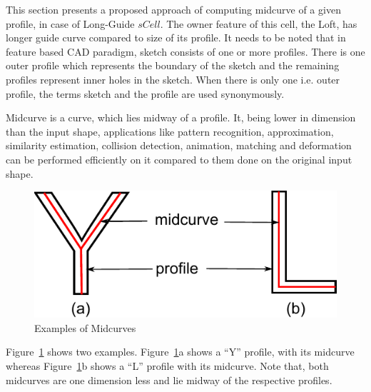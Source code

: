 This section presents a proposed approach of computing midcurve of a given profile, in case of Long-Guide $sCell$. The owner feature of this cell, the Loft, has longer guide curve compared to size of its profile. It needs to be noted that in feature based CAD paradigm, sketch consists of one or more profiles. There is one outer profile which represents the boundary of the sketch and the remaining profiles represent inner holes in the sketch. When there is only one i.e. outer profile, the terms sketch and the profile are used synonymously.

Midcurve is a curve, which lies midway of a profile.  It, being lower in dimension than the input shape, applications like pattern recognition, approximation, similarity estimation, collision detection, animation, matching and deformation can be performed efficiently on it compared to them done on the original input shape. 



\begin{figure}[h]
\centering \includegraphics[width=0.45\linewidth]{../Common/images/midcurveexamples_1.pdf} 
\caption{Examples of Midcurves}
\label{fig_midcruveexamples}
\end{figure}


Figure~\ref{fig_midcruveexamples} shows two examples. Figure~\ref{fig_midcruveexamples}a shows a ``Y'' profile, with its midcurve whereas Figure~\ref{fig_midcruveexamples}b shows a ``L'' profile with its midcurve. Note that, both midcurves are one dimension less and lie midway of the respective profiles.


